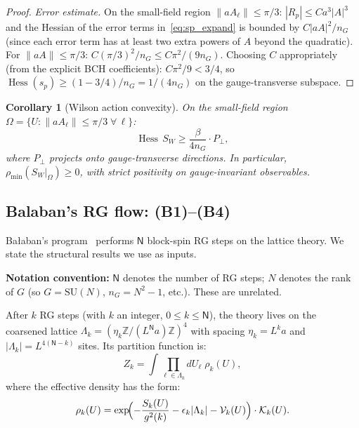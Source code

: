 \documentclass[11pt,a4paper]{article}
\theoremstyle{plain}
\newtheorem{corollary}[theorem]{Corollary}
\theoremstyle{definition}
\theoremstyle{remark}
\newcommand{\Z}{\mathbb{Z}}
\newcommand{\Hess}{\operatorname{Hess}}
\newcommand{\SU}{\mathrm{SU}}
\newcommand{\cV}{\mathcal{V}}
\newcommand{\cK}{\mathcal{K}}
\begin{document}
\begin{proof}
\emph{Error estimate.} On the small-field region
$\|aA_\ell\| \le \pi/3$: $|R_p| \le C a^3|A|^3$
and the Hessian of the error terms in~\eqref{eq:sp_expand}
is bounded by $C|aA|^2/n_G$ (since each error term
has at least two extra powers of $A$ beyond the
quadratic). For $\|aA\| \le \pi/3$:
$C(\pi/3)^2/n_G \le C\pi^2/(9n_G)$. Choosing $C$
appropriately (from the explicit BCH coefficients):
$C\pi^2/9 < 3/4$, so
$\Hess(s_p) \ge (1 - 3/4)/n_G = 1/(4n_G)$ on the
gauge-transverse subspace.
\end{proof}

\begin{corollary}[Wilson action convexity]
\label{cor:wilson_convex}
On the small-field region
$\Omega = \{U : \|aA_\ell\| \le \pi/3 \;\forall\,\ell\}$:
\begin{equation}
  \Hess\,S_W \ge \frac{\beta}{4n_G} \cdot P_\perp,
\end{equation}
where $P_\perp$ projects onto gauge-transverse directions.
In particular, $\rho_{\min}(S_W|_\Omega) \ge 0$, with
strict positivity on gauge-invariant observables.
\end{corollary}

\subsection{Balaban's RG flow: (B1)--(B4)}\label{ssec:balaban}

Ba{\l}aban's program~\cite{Bal87,Bal88a,Bal88b,Bal89}
performs $\mathsf{N}$ block-spin RG steps on the lattice theory.
We state the structural results we use as inputs.

\textbf{Notation convention:} $\mathsf{N}$ denotes the number of
RG steps; $N$ denotes the rank of $G$ (so $G = \SU(N)$,
$n_G = N^2 - 1$, etc.). These are unrelated.

After $k$ RG steps (with $k$ an integer,
$0 \le k \le \mathsf{N}$), the theory lives on the
coarsened lattice $\Lambda_k = (\eta_k\Z/(L^{\mathsf{N}}a)\Z)^4$
with spacing $\eta_k = L^k a$ and $|\Lambda_k| = L^{4(\mathsf{N}-k)}$
sites. Its partition function is:
\begin{equation}\label{eq:RG_partition}
  Z_k = \int \prod_{\ell \in \Lambda_k} dU_\ell\;
  \rho_k(U),
\end{equation}
where the effective density has the form:
\begin{equation}\label{eq:RG_form}
  \rho_k(U) = \exp\!\Bigl(
  -\frac{S_k(U)}{g^2(k)}
  - \epsilon_k |\Lambda_k|
  - \cV_k(U)\Bigr) \cdot \cK_k(U).
\end{equation}
\end{document}

